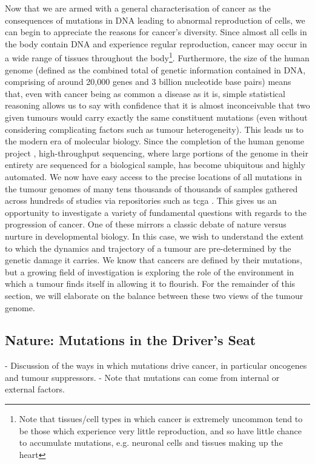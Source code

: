 \documentclass[10pt,twoside,openright]{report}
\begin{document}
Now that we are armed with a general characterisation of cancer as the consequences of mutations in DNA leading to abnormal reproduction of cells, we can begin to appreciate the reasons for cancer's diversity. Since almost all cells in the body contain DNA and experience regular reproduction, cancer may occur in a wide range of tissues throughout the body\footnote{Note that tissues/cell types in which cancer is extremely uncommon tend to be those which experience very little reproduction, and so have little chance to accumulate mutations, e.g. neuronal cells and tissues making up the heart}. Furthermore, the size of the human genome (defined as the combined total of genetic information contained in DNA, comprising of around 20,000 genes and 3 billion nucleotide base pairs) means that, even with cancer being as common a disease as it is, simple statistical reasoning allows us to say with confidence that it is almost inconceivable that two given tumours would carry exactly the same constituent mutations (even without considering complicating factors such as tumour heterogeneity). This leads us to the modern era of molecular biology. Since the completion of the human genome project \citep{lander_initial_2001}, high-throughput sequencing, where large portions of the genome in their entirety are sequenced for a biological sample, has become ubiquitous and highly automated. We now have easy access to the precise locations of all mutations in the tumour genomes of many tens thousands of thousands of samples gathered across hundreds of studies via repositories such as \acrfull{tcga} \citep{weinstein_cancer_2013}. This gives us an opportunity to investigate a variety of fundamental questions with regards to the progression of cancer. One of these mirrors a classic debate of nature versus nurture in developmental biology. In this case, we wish to understand the extent to which the dynamics and trajectory of a tumour are pre-determined by the genetic damage it carries. We know that cancers are defined by their mutations, but a growing field of investigation is exploring the role of the environment in which a tumour finds itself in allowing it to flourish. For the remainder of this section, we will elaborate on the balance between these two views of the tumour genome.
\subsection{Nature: Mutations in the Driver's Seat}
- Discussion of the ways in which mutations drive cancer, in particular oncogenes and tumour suppressors.
- Note that mutations can come from internal or external factors.
\end{document}
